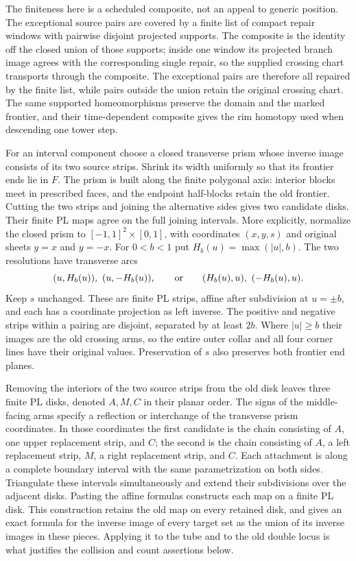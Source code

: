 The finiteness here is a scheduled composite, not an appeal to generic
position.  The exceptional source pairs are covered by a finite list of
compact repair windows with pairwise disjoint projected supports.  The
composite is the identity off the closed union of those supports; inside
one window its projected branch image agrees with the corresponding
single repair, so the supplied crossing chart transports through the
composite.  The exceptional pairs are therefore all repaired by the
finite list, while pairs outside the union retain the original crossing
chart.  The same supported homeomorphisms preserve the domain and the
marked frontier, and their time-dependent composite gives the rim
homotopy used when descending one tower step.

For an interval component choose a closed transverse prism whose
inverse image consists of its two source strips.  Shrink its width
uniformly so that its frontier ends lie in $F$.  The prism is built
along the finite polygonal axis: interior blocks meet in prescribed
faces, and the endpoint half-blocks retain the old frontier.  Cutting
the two strips and joining the alternative sides gives two candidate
disks.  Their finite PL maps agree on the full joining intervals.
More explicitly, normalize the closed prism to
$[-1,1]^2\times[0,1]$, with coordinates $(x,y,s)$ and original sheets
$y=x$ and $y=-x$.  For $0<b<1$ put $H_b(u)=\max(|u|,b)$.
The two resolutions have transverse arcs
\[
 (u,H_b(u)),\ (u,-H_b(u)),\qquad\hbox{or}\qquad
 (H_b(u),u),\ (-H_b(u),u).
\]
Keep $s$ unchanged.  These are finite PL strips, affine after
subdivision at $u=\pm b$, and each has a coordinate projection as
left inverse.  The positive and negative strips within a pairing
are disjoint, separated by at least $2b$.  Where $|u|\geq b$
their images are the old crossing arms, so the entire outer collar
and all four corner lines have their original values.  Preservation
of $s$ also preserves both frontier end planes.

Removing the interiors of the two source strips from the old disk
leaves three finite PL disks, denoted $A,M,C$ in their planar order.
The signs of the middle-facing arms specify a reflection or
interchange of the transverse prism coordinates.  In those coordinates
the first candidate is the chain consisting of $A$, one upper
replacement strip, and $C$; the second is the chain consisting of
$A$, a left replacement strip, $M$, a right replacement strip,
and $C$.  Each attachment is along a complete boundary interval
with the same parametrization on both sides.  Triangulate these
intervals simultaneously and extend their subdivisions over the
adjacent disks.  Pasting the affine formulas constructs each map
on a finite PL disk.  This construction retains the old map on
every retained disk, and gives an exact formula for the inverse
image of every target set as the union of its inverse images in
these pieces.  Applying it to the tube and to the old double locus
is what justifies the collision and count assertions below.

